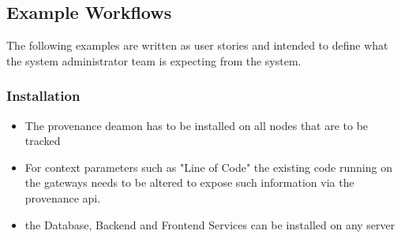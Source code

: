 


\subsection{Example Workflows}

The following examples are written as user stories and intended to define what the system administrator team is expecting from the system.

\subsubsection{Installation}
\begin{itemize}
  \item The provenance deamon has to be installed on all nodes that are to be tracked
  \item For context parameters such as "Line of Code" the existing code running on the gateways needs to be altered to expose such information via the provenance api.
  \item the Database, Backend and Frontend Services can be installed on any server
\end{itemize}

